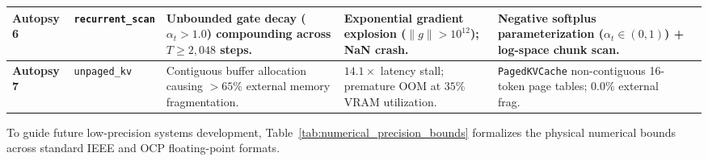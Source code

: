 \begin{table}[t]
{\begin{tabular}{@{} l >{\raggedright\arraybackslash}p{2.4cm} >{\raggedright\arraybackslash}p{3.8cm} >{\raggedright\arraybackslash}p{2.6cm} >{\raggedright\arraybackslash}p{4.4cm} c @{}}
\midrule
\textbf{Autopsy 6} & \texttt{recurrent\_scan} & Unbounded gate decay ($\alpha_t > 1.0$) compounding across $T \ge 2{,}048$ steps. & Exponential gradient explosion ($\|g\| > 10^{12}$); NaN crash. & Negative softplus parameterization ($\alpha_t \in (0, 1)$) + log-space chunk scan. & \passfast{} \\
\midrule
\textbf{Autopsy 7} & \texttt{unpaged\_kv} & Contiguous buffer allocation causing $>65\%$ external memory fragmentation. & $14.1\times$ latency stall; premature OOM at $35\%$ VRAM utilization. & \texttt{PagedKVCache} non-contiguous 16-token page tables; $0.0\%$ external frag. & \passfast{} \\
\bottomrule
\end{tabular}
}
\end{table}

To guide future low-precision systems development, Table~\ref{tab:numerical_precision_bounds} formalizes the physical numerical bounds across standard IEEE and OCP floating-point formats.

\begin{table}[t]
\centering
\caption[Numerical Stability and Precision Envelopes Across Floating-Point Formats]{\textbf{Numerical Stability and Precision Envelopes Across Floating-Point Formats.} Detailing bit allocations (Sign, Exponent, Mantissa), exponent bias, representable dynamic ranges, and empirical suitability for forward and backward Transformer operators.}
\label{tab:numerical_precision_bounds}
\end{table}

